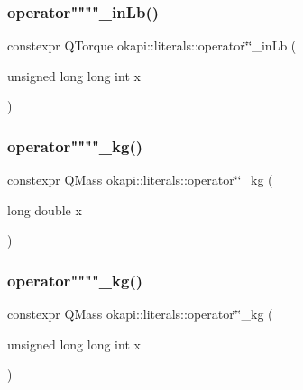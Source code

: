 \mbox{\label{namespaceokapi_1_1literals_a7bb3fd8e274b246c16fb5d7189e280dc}} 
\subsubsection{\texorpdfstring{operator""""\_inLb()}{operator""\_inLb()}\hspace{0.1cm}{\footnotesize\ttfamily [2/2]}}
{\footnotesize\ttfamily constexpr Q\+Torque okapi\+::literals\+::operator\char`\"{}\char`\"{}\+\_\+in\+Lb (\begin{DoxyParamCaption}\item[{unsigned long long int}]{x }\end{DoxyParamCaption})}

\mbox{\label{namespaceokapi_1_1literals_a64be793bec350dc02ca149670dfa3942}} 
\subsubsection{\texorpdfstring{operator""""\_kg()}{operator""\_kg()}\hspace{0.1cm}{\footnotesize\ttfamily [1/2]}}
{\footnotesize\ttfamily constexpr Q\+Mass okapi\+::literals\+::operator\char`\"{}\char`\"{}\+\_\+kg (\begin{DoxyParamCaption}\item[{long double}]{x }\end{DoxyParamCaption})}

\mbox{\label{namespaceokapi_1_1literals_aeeac66a4f9103ec59f750da7f8c17286}} 
\subsubsection{\texorpdfstring{operator""""\_kg()}{operator""\_kg()}\hspace{0.1cm}{\footnotesize\ttfamily [2/2]}}
{\footnotesize\ttfamily constexpr Q\+Mass okapi\+::literals\+::operator\char`\"{}\char`\"{}\+\_\+kg (\begin{DoxyParamCaption}\item[{unsigned long long int}]{x }\end{DoxyParamCaption})}

